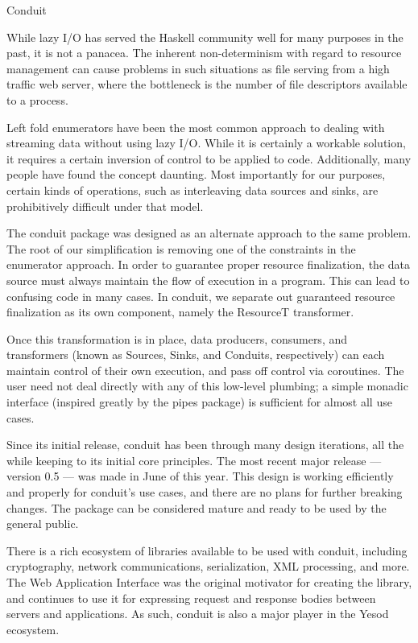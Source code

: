 \begin{hcarentry}[updated]{Conduit}
\label{conduit}
\makeheader

While lazy I/O has served the Haskell community well for many purposes in the past, it is not a panacea. The inherent non-determinism with regard to resource management can cause problems in such situations as file serving from a high traffic web server, where the bottleneck is the number of file descriptors available to a process.

Left fold enumerators have been the most common approach to dealing with streaming data without using lazy I/O. While it is certainly a workable solution, it requires a certain inversion of control to be applied to code. Additionally, many people have found the concept daunting. Most importantly for our purposes, certain kinds of operations, such as interleaving data sources and sinks, are prohibitively difficult under that model.

The conduit package was designed as an alternate approach to the same problem. The root of our simplification is removing one of the constraints in the enumerator approach. In order to guarantee proper resource finalization, the data source must always maintain the flow of execution in a program. This can lead to confusing code in many cases. In conduit, we separate out guaranteed resource finalization as its own component, namely the ResourceT transformer.

Once this transformation is in place, data producers, consumers, and transformers (known as Sources, Sinks, and Conduits, respectively) can each maintain control of their own execution, and pass off control via coroutines. The user need not deal directly with any of this low-level plumbing; a simple monadic interface (inspired greatly by the pipes package) is sufficient for almost all use cases.

Since its initial release, conduit has been through many design iterations, all the while keeping to its initial core principles. The most recent major release --- version 0.5 --- was made in June of this year. This design is working efficiently and properly for conduit's use cases, and there are no plans for further breaking changes. The package can be considered mature and ready to be used by the general public.

There is a rich ecosystem of libraries available to be used with conduit, including cryptography, network communications, serialization, XML processing, and more. The Web Application Interface was the original motivator for creating the library, and continues to use it for expressing request and response bodies between servers and applications. As such, conduit is also a major player in the Yesod ecosystem.


\end{hcarentry}
